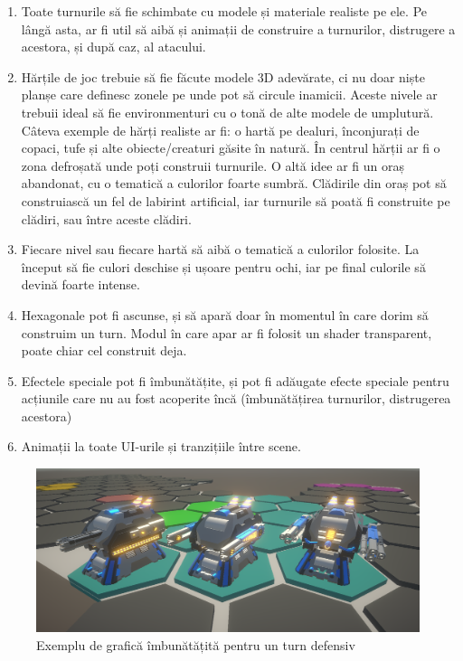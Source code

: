 \documentclass[12pt, a4paper]{article}
\begin{document}
	\begin{enumerate}
		\item Toate turnurile să fie schimbate cu modele și materiale realiste pe ele. Pe lângă asta, ar fi util să aibă și animații de construire a turnurilor, distrugere a acestora, și după caz, al atacului.
		\item Hărțile de joc trebuie să fie făcute modele 3D adevărate, ci nu doar niște planșe care definesc zonele pe unde pot să circule inamicii. Aceste nivele ar trebuii ideal să fie environmenturi cu o tonă de alte modele de umplutură. Câteva exemple de hărți realiste ar fi: o hartă pe dealuri, înconjurați de copaci, tufe și alte obiecte/creaturi găsite în natură. În centrul hărții ar fi o zona defroșată unde poți construii turnurile. O altă idee ar fi un oraș abandonat, cu o tematică a culorilor foarte sumbră. Clădirile din oraș pot să construiască un fel de labirint artificial, iar turnurile să poată fi construite pe clădiri, sau între aceste clădiri.
		\item Fiecare nivel sau fiecare hartă să aibă o tematică a culorilor folosite. La început să fie culori deschise și ușoare pentru ochi, iar pe final culorile să devină foarte intense.
		\item Hexagonale pot fi ascunse, și să apară doar în momentul în care dorim să construim un turn. Modul în care apar ar fi folosit un shader transparent, poate chiar cel construit deja.
		\item Efectele speciale pot fi îmbunătățite, și pot fi adăugate efecte speciale pentru acțiunile care nu au fost acoperite încă (îmbunătățirea turnurilor, distrugerea acestora)
		\item Animații la toate UI-urile și tranzițiile între scene.
	\end{enumerate}
	
	\begin{figure}[H]
		\centering
		\includegraphics[width=1\textwidth]{betterMachineGun.png}
		\caption{Exemplu de grafică îmbunătățită pentru un turn defensiv}
		\label{fig: betterTurret}
	\end{figure}
	
\end{document}
